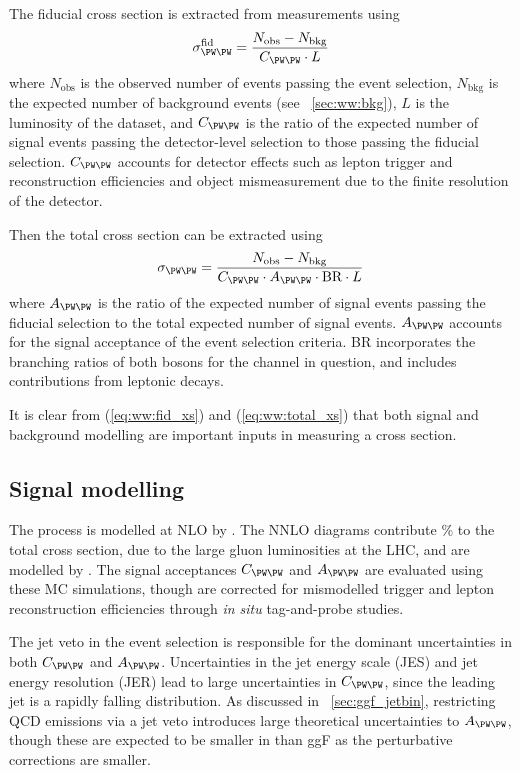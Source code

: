The fiducial cross section is extracted from measurements using
\begin{equation}
	\sigma_{\WW}^{\text{fid}} = \frac{N_{\text{obs}} - N_{\text{bkg}}}{C_{\WW} \cdot L}
	\label{eq:ww:fid_xs}
\end{equation}
where $N_{\text{obs}}$ is the observed number of events passing the event selection, 
$N_{\text{bkg}}$ is the expected number of background events (see 
\Section~\ref{sec:ww:bkg}), $L$ is the luminosity of the dataset, and $C_{\WW}$ is the 
ratio of the expected number of signal events passing the detector-level selection to 
those passing the fiducial selection. $C_{\WW}$ accounts for detector effects such as 
lepton trigger and reconstruction efficiencies and object mismeasurement due to the 
finite resolution of the detector.

Then the total cross section can be extracted using
\begin{equation}
	\sigma_{\WW} = \frac{N_{\text{obs}} - N_{\text{bkg}}}{C_{\WW} \cdot A_{\WW} \cdot \text{BR} \cdot L}
	\label{eq:ww:total_xs}
\end{equation}
where $A_{\WW}$ is the ratio of the expected number of signal events passing the fiducial 
selection to the total expected number of signal events. $A_{\WW}$ accounts for the 
signal acceptance of the event selection criteria. BR incorporates the branching ratios 
of both \PW bosons for the channel in question, and includes contributions from leptonic 
\Ptau decays.

It is clear from (\ref{eq:ww:fid_xs}) and (\ref{eq:ww:total_xs}) that both signal and 
background modelling are important inputs in measuring a cross section.



\subsection{Signal modelling}
\label{sec:ww:signal}

The \WW process is modelled at NLO by \meps{\mcatnlo}{\fherwig}. The NNLO \ggWW diagrams 
contribute \% to the total cross section, due to the large gluon luminosities at 
the LHC, and are modelled by \meps{\ggtoww}{\fherwig} \cite{gg2ww}. The signal 
acceptances $C_{\WW}$ and $A_{\WW}$ are evaluated using these MC simulations, though 
are corrected for mismodelled trigger and lepton reconstruction efficiencies through 
\textit{in situ} tag-and-probe studies.

The jet veto in the event selection is responsible for the dominant uncertainties in both 
$C_{\WW}$ and $A_{\WW}$. Uncertainties in the jet energy scale (JES) and jet energy 
resolution (JER) lead to large uncertainties in $C_{\WW}$, since the leading jet \pt is a 
rapidly falling distribution. As discussed in \Section~\ref{sec:ggf_jetbin}, restricting 
QCD emissions via a jet veto introduces large theoretical uncertainties to $A_{\WW}$, 
though these are expected to be smaller in \WW than ggF as the perturbative corrections 
are smaller.

